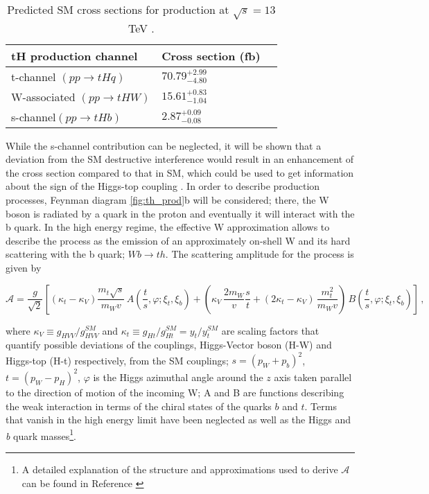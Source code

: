 \begin{center}
\begin{table}[h]
\centering
\begin{tabular}{lll}\hline
tH production channel       & Cross section (fb)      \\\hline
t-channel $(pp \to tHq)$    & $70.79^{+2.99}_{-4.80}$ \\
W-associated $(pp \to tHW)$ & $15.61^{+0.83}_{-1.04}$ \\
s-channel$(pp \to tHb)$     & $ 2.87^{+0.09}_{-0.08}$ \\\hline
\end{tabular}
\caption[Predicted SM cross sections for \tH production at $\sqrt{s}=13$ TeV.]{Predicted SM cross sections for \tH production at $\sqrt{s}=13$ TeV \cite{thqw_xsec, thb_xsec}.}\label{tab:th_xsec}
\end{table}
\end{center}

While the s-channel contribution can be neglected, it will be shown that a deviation from the SM destructive interference would result in an enhancement of the \tH cross section compared to that in SM, which could be used to get information about the sign of the Higgs-top coupling \cite{farina,tait}. In order to describe \tH production processes, Feynman diagram \ref{fig:th_prod}b will be considered; there, the W boson is radiated by a quark in the proton and eventually it will interact with the b quark. In the high energy regime, the effective W approximation \cite{dawson} allows to describe the process as the emission of an approximately on-shell W and its hard scattering with the b quark; \ie $Wb \to th$. The scattering amplitude for the process is given by

\begin{equation} \label{s_amp}
\mathcal{A}= \frac{g}{\sqrt{2}}\left[(\kappa_t-\kappa_V)\frac{m_t\sqrt{s}}{m_Wv}\,A\left(\frac{t}{s},\varphi; \xi_{t},\xi_{b}\right)+\left(\kappa_V\,\frac{2m_W}{v}\frac{s}{t}+(2\kappa_t-\kappa_V)\,\frac{m_t^{2}}{m_Wv}\right)\,B\left(\frac{t}{s},\varphi; \xi_{t},\xi_{b}\right)\right]\,,
\end{equation}

\noindent where $\kappa_V\equiv g_{HVV}/g_{HVV}^{SM}$ and $\kappa_t\equiv g_{Ht}/g_{Ht}^{SM}=y_t/y_t^{SM}$ are scaling factors that quantify possible deviations of the couplings, Higgs-Vector boson (H-W) and Higgs-top (H-t) respectively, from the SM couplings; $s=(p_{W}+p_{b})^{2}$, $t=(p_{W}-p_{H})^{2}$, $\varphi$ is the Higgs azimuthal angle around the $z$ axis taken parallel to the direction of motion of the incoming W; A and B are functions describing the weak interaction in terms of the chiral states of the quarks $b$ and $t$. Terms that vanish in the high energy limit have been neglected as well as the Higgs and \textit{b} quark masses\footnote{A detailed explanation of the structure and approximations used to derive $\mathcal{A}$ can be found in Reference \cite{farina}}.\\        

